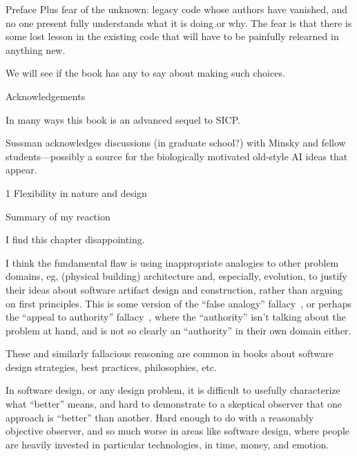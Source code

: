 \documentclass[12pt]{PalisadesLakesBook}
\begin{document}
\begin{plSection}{}
\begin{plSection}{Preface}
Plus fear of the unknown: legacy code whose authors have vanished,
and no one present fully understands what it is doing or why.
The fear is that there is some lost lesson in the existing
code that will have to be painfully relearned in anything new.

We will see if the book has any to say about making such choices.

\end{plSection}%
\begin{plSection}{Acknowledgements}
\begin{plQuote}
{}{}
In many ways this book is an advanced sequel to SICP.
\end{plQuote}

Sussman acknowledges discussions (in graduate school?)
with Minsky and fellow students---possibly a source for the
biologically motivated old-style AI ideas that appear.
\end{plSection}%
\begin{plSection}{1 Flexibility in nature and design}
\begin{plSection}{Summary of my reaction}

I find this chapter disappointing.

I think the fundamental flaw is using 
inappropriate analogies to other problem domains,
eg, (physical building) architecture
and, especially, evolution, 
to justify their ideas about software artifact design
and construction,
rather than arguing on first principles.
This is some version of the ``false analogy'' 
fallacy~\cite{wiki:ArgumentFromAnalogyFalse},
or perhaps the
``appeal to authority'' fallacy~\cite{wiki:ArgumentFromAuthority},
where the ``authority'' isn't talking about the problem at hand, 
and is not so clearly an ``authority'' in their own domain either.

These and similarly fallacious reasoning are common
in books about software design strategies, best practices,
philosophies, etc.

In software design, or any design problem,
it is difficult to usefully characterize what ``better'' means,
and hard to demonstrate to a skeptical observer that one
approach is ``better'' than another.
Hard enough to do with a reasonably objective observer,
and so much worse in areas like software design,
where people are heavily invested in particular technologies,
in time, money, and emotion.


\end{plSection}
\end{plSection}
\end{plSection}
\end{document}
